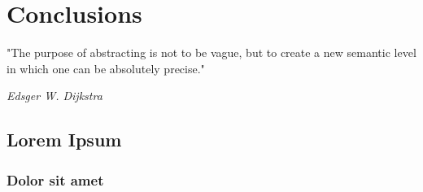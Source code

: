 \chapter*{Conclusions}
\label{chap:concl}

\epigraph{"The purpose of abstracting is not to be vague, but to create a new semantic level in which one can be absolutely precise."}{\textit{Edsger W. Dijkstra}}

\lipsum[1]


\section{Lorem Ipsum}
\lipsum[2-4]

\subsection{Dolor sit amet}
\lipsum[5-7]